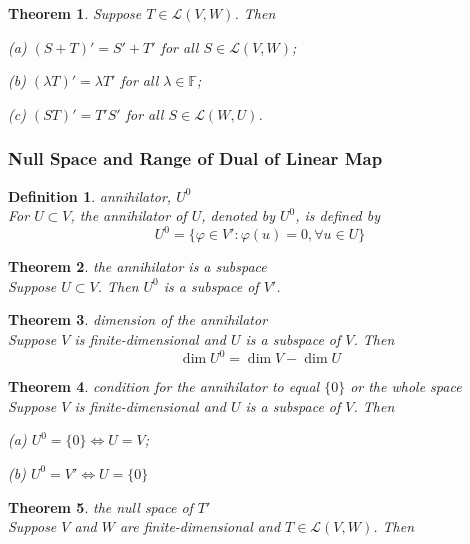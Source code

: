 \documentclass{article}
\newtheorem{theorem}{Theorem}[subsection]
\newtheorem{definition}{Definition}[subsection]
\newcommand{\FF}{\mathbb{F}}
\begin{document}
\begin{CJK}{UTF8}{gkai}
\begin{theorem}
    Suppose $T \in \mathcal{L}(V,W)$. Then

    (a) $(S +T)' = S' +T'$ for all $S \in \mathcal{L}(V,W)$;

    (b) $(\lambda T)' = \lambda T'$ for all $\lambda  \in \FF$;

    (c) $(ST)' = T'S'$ for all $S \in \mathcal{L}(W, U)$.\\
\end{theorem}

\subsubsection{Null Space and Range of Dual of Linear Map}

\begin{definition}
    annihilator,  $U^0$\\

    For $U \subset V$, the annihilator of $U$, denoted by  $U^0$, is defined by
    \[U^0 =\{\varphi \in V' :\varphi(u) = 0 ,\forall u \in  U\}\]
\end{definition}

\begin{theorem}
    the annihilator is a subspace\\

    Suppose $U \subset V$. Then  $U^0$ is a subspace of $V'$.
\end{theorem}

\begin{theorem}
    dimension of the annihilator\\

    Suppose $V$ is finite-dimensional and $U$ is a subspace of $V$. Then
    \[\dim U^0 = \dim V - \dim U\]
\end{theorem}

\begin{theorem}
    condition for the annihilator to equal $\{0\}$ or the whole space\\

    Suppose $V$ is finite-dimensional and $U$ is a subspace of $V$. Then

    (a)  $U^0 = \{0\} \Leftrightarrow  U =V$;

    (b)  $U^0 = V' \Leftrightarrow  U=\{0\}$
\end{theorem}

\begin{theorem}
    the null space of $T'$\\

 Suppose $V$ and $W$ are finite-dimensional and $T \in \mathcal{L}(V,W)$. Then


\end{theorem}
\end{CJK}
\end{document}

